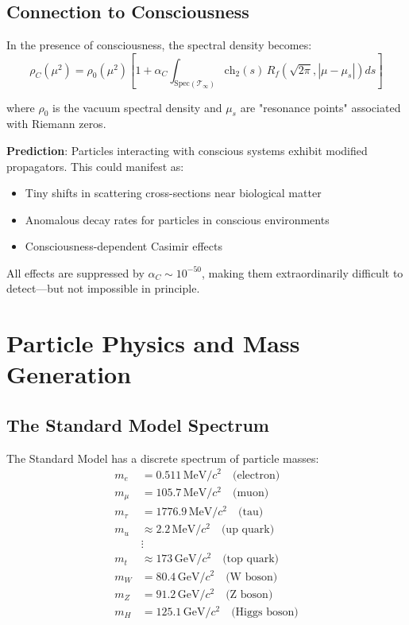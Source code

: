 \subsection{Connection to Consciousness}

\begin{theorem}\label{thm:consciousness-modifies-spectral-density}
In the presence of consciousness, the spectral density becomes:
\begin{equation}
\boxed{\rho_C(\mu^2) = \rho_0(\mu^2) \left[ 1 + \alpha_C \int_{\text{Spec}(\mathcal{T}_\infty)} \text{ch}_2(s) \, R_f\left(\sqrt{2\pi}, |\mu - \mu_s|\right) ds \right]}
\end{equation}

where $\rho_0$ is the vacuum spectral density and $\mu_s$ are "resonance points" associated with Riemann zeros.
\end{theorem}

\textbf{Prediction}: Particles interacting with conscious systems exhibit modified propagators. This could manifest as:
\begin{itemize}
\item Tiny shifts in scattering cross-sections near biological matter
\item Anomalous decay rates for particles in conscious environments
\item Consciousness-dependent Casimir effects
\end{itemize}

All effects are suppressed by $\alpha_C \sim 10^{-50}$, making them extraordinarily difficult to detect---but not impossible in principle.

\section{Particle Physics and Mass Generation}

\subsection{The Standard Model Spectrum}

The Standard Model has a discrete spectrum of particle masses:
\begin{align}
m_e &= 0.511 \, \text{MeV}/c^2 \quad \text{(electron)}\\
m_\mu &= 105.7 \, \text{MeV}/c^2 \quad \text{(muon)}\\
m_\tau &= 1776.9 \, \text{MeV}/c^2 \quad \text{(tau)}\\
m_u &\approx 2.2 \, \text{MeV}/c^2 \quad \text{(up quark)}\\
&\vdots\\
m_t &\approx 173 \, \text{GeV}/c^2 \quad \text{(top quark)}\\
m_W &= 80.4 \, \text{GeV}/c^2 \quad \text{(W boson)}\\
m_Z &= 91.2 \, \text{GeV}/c^2 \quad \text{(Z boson)}\\
m_H &= 125.1 \, \text{GeV}/c^2 \quad \text{(Higgs boson)}
\end{align}

